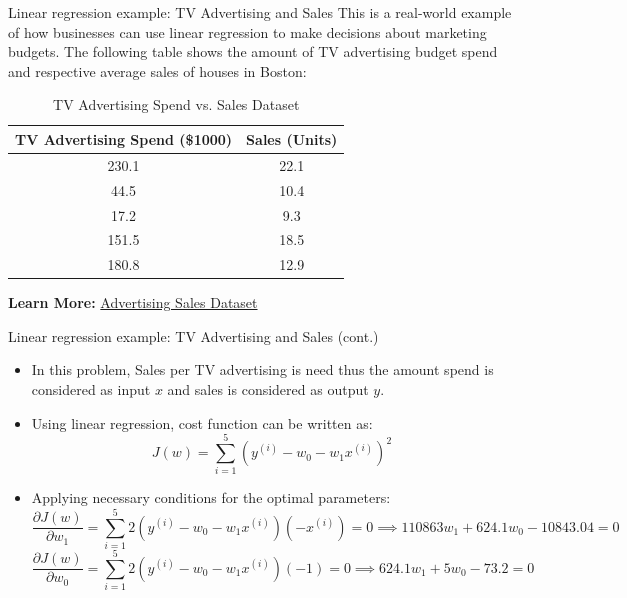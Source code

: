 \documentclass[serif, aspectratio=169]{beamer}
\begin{document}
\begin{frame}{Linear regression example: TV Advertising and Sales}
    This is a real-world example of how businesses can use linear regression to make decisions about marketing budgets. The following table shows the amount of TV advertising budget spend and respective average sales of houses in Boston:
    \begin{table}[h!]
    \centering
    \begin{tabular}{|c|c|}
    \hline
    \textbf{TV Advertising Spend (\$1000)} & \textbf{Sales (Units)} \\ \hline
    230.1                                  & 22.1                   \\ \hline
    44.5                                   & 10.4                   \\ \hline
    17.2                                   & 9.3                    \\ \hline
    151.5                                  & 18.5                   \\ \hline
    180.8                                  & 12.9                   \\ \hline
    \end{tabular}
    \caption{TV Advertising Spend vs. Sales Dataset}
    \end{table}

\textbf{Learn More:}
\href{https://www.kaggle.com/datasets/yasserh/advertising-sales-dataset}{Advertising Sales Dataset}
\end{frame}





\begin{frame}{Linear regression example: TV Advertising and Sales (cont.)}
    \begin{itemize}
        \item In this problem, Sales per TV advertising is need thus the amount spend is considered as input \( x \) and sales is considered as output \( y \).
        \item Using linear regression, cost function can be written as:
        \[
        J(w) = \sum_{i=1}^{5} \left( y^{(i)} - w_0 - w_1 x^{(i)} \right)^2
        \]
        \item Applying necessary conditions for the optimal parameters:
        \[
        \frac{\partial J(w)}{\partial w_1} = \sum_{i=1}^{5} 2 \left( y^{(i)} - w_0 - w_1 x^{(i)} \right) (-x^{(i)}) = 0 \implies 110863 w_1 + 624.1 w_0 - 10843.04 = 0
        \]
        \[
        \frac{\partial J(w)}{\partial w_0} = \sum_{i=1}^{5} 2 \left( y^{(i)} - w_0 - w_1 x^{(i)} \right) (-1) = 0 \implies 624.1 w_1 + 5 w_0 - 73.2 = 0
        \]
    \end{itemize}
\end{frame}
\end{document}
